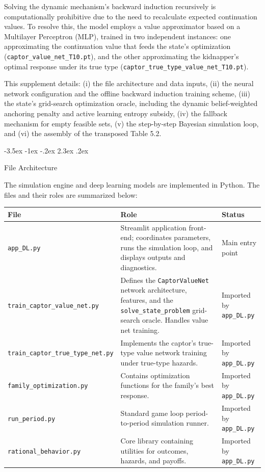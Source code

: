 \documentclass[12pt]{article}
\makeatletter
\newcommand{\pyfile}[1]{\texttt{#1}}
\newcommand{\pyvar}[1]{\texttt{#1}}
\numberwithin{equation}{section}
\numberwithin{table}{section}
\renewcommand\section{\@startsection {section}{1}{\z@}%
                                   {-3.5ex \@plus -1ex \@minus -.2ex}%
                                   {2.3ex \@plus.2ex}%
                                   {\normalfont\Large\bfseries\raggedright}}
\makeatother
\begin{document}
Solving the dynamic mechanism's backward induction recursively is computationally prohibitive due to the need to recalculate expected continuation values. To resolve this, the model employs a value approximator based on a Multilayer Perceptron (MLP), trained in two independent instances: one approximating the continuation value that feeds the state's optimization (\pyfile{captor\_value\_net\_T10.pt}), and the other approximating the kidnapper's optimal response under its true type (\pyfile{captor\_true\_type\_value\_net\_T10.pt}).

This supplement details: (i) the file architecture and data inputs, (ii) the neural network configuration and the offline backward induction training scheme, (iii) the state's grid-search optimization oracle, including the dynamic belief-weighted anchoring penalty and active learning entropy subsidy, (iv) the fallback mechanism for empty feasible sets, (v) the step-by-step Bayesian simulation loop, and (vi) the assembly of the transposed Table 5.2.

\section{File Architecture}

The simulation engine and deep learning models are implemented in Python. The files and their roles are summarized below:

\begin{center}
\footnotesize
\begin{tabularx}{\textwidth}{@{}l X l@{}}
\toprule
\textbf{File} & \textbf{Role} & \textbf{Status} \\
\midrule
\pyfile{app\_DL.py} & Streamlit application front-end; coordinates parameters, runs the simulation loop, and displays outputs and diagnostics. & Main entry point \\
\pyfile{train\_captor\_value\_net.py} & Defines the \pyvar{CaptorValueNet} network architecture, features, and the \pyvar{solve\_state\_problem} grid-search oracle. Handles value net training. & Imported by \pyfile{app\_DL.py} \\
\pyfile{train\_captor\_true\_type\_net.py} & Implements the captor's true-type value network training under true-type hazards. & Imported by \pyfile{app\_DL.py} \\
\pyfile{family\_optimization.py} & Contains optimization functions for the family's best response. & Imported by \pyfile{app\_DL.py} \\
\pyfile{run\_period.py} & Standard game loop period-to-period simulation runner. & Imported by \pyfile{app\_DL.py} \\
\pyfile{rational\_behavior.py} & Core library containing utilities for outcomes, hazards, and payoffs. & Imported by \pyfile{app\_DL.py} \\
\bottomrule
\end{tabularx}
\normalsize
\end{center}
\end{document}
